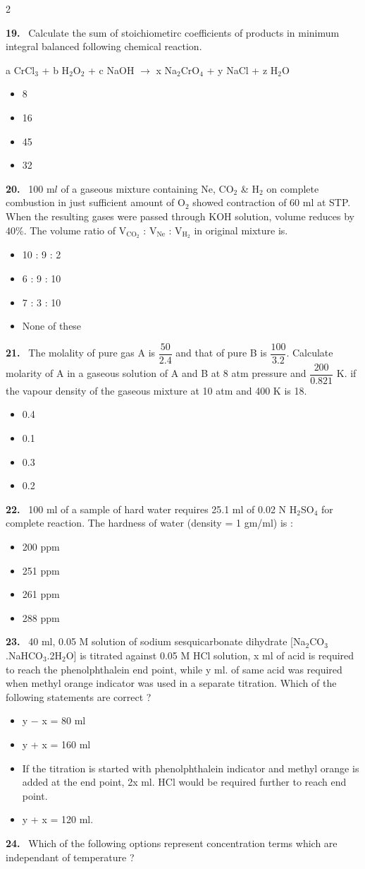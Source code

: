 \documentclass[10pt]{extarticle}
\newcommand{\partsec}[2]{\par\medskip\noindent{\large\bfseries PART-#1: #2}\par\smallskip}
\newcommand{\qn}[1]{\par\smallskip\noindent\textbf{#1.}~}
\newenvironment{qoptions}{\begin{itemize}[leftmargin=1.8em,itemsep=1pt,topsep=2pt,label={}]}{\end{itemize}}
\newcommand{\opt}[2]{\item[(#1)] #2}
\begin{document}
\begin{multicols}{2}
\partsec{2}{CHEMISTRY}
\qn{19} Calculate the sum of stoichiometirc coefficients of products in minimum integral balanced following chemical reaction.\par
a CrCl$_3$ + b H$_2$O$_2$ + c NaOH $\longrightarrow$ x Na$_2$CrO$_4$ + y NaCl + z H$_2$O
\begin{qoptions}
\opt{A}{8}
\opt{B}{16}
\opt{C}{45}
\opt{D}{32}
\end{qoptions}
\qn{20} 100 m$l$ of a gaseous mixture containing Ne, CO$_2$ \& H$_2$ on complete combustion in just sufficient amount of O$_2$ showed contraction of 60 ml at STP. When the resulting gases were passed through KOH solution, volume reduces by 40\%. The volume ratio of V$_{\mathrm{CO}_2}$ : V$_\mathrm{Ne}$ : V$_{\mathrm H_2}$ in original mixture is.
\begin{qoptions}
\opt{A}{10 : 9 : 2}
\opt{B}{6 : 9 : 10}
\opt{C}{7 : 3 : 10}
\opt{D}{None of these}
\end{qoptions}
\qn{21} The molality of pure gas A is $\dfrac{50}{2.4}$ and that of pure B is $\dfrac{100}{3.2}$. Calculate molarity of A in a gaseous solution of A and B at 8 atm pressure and $\dfrac{200}{0.821}$ K. if the vapour density of the gaseous mixture at 10 atm and 400 K is 18.
\begin{qoptions}
\opt{A}{0.4}
\opt{B}{0.1}
\opt{C}{0.3}
\opt{D}{0.2}
\end{qoptions}
\qn{22} 100 ml of a sample of hard water requires 25.1 ml of 0.02 N H$_2$SO$_4$ for complete reaction. The hardness of water (density = 1 gm/ml) is :
\begin{qoptions}
\opt{A}{200 ppm}
\opt{B}{251 ppm}
\opt{C}{261 ppm}
\opt{D}{288 ppm}
\end{qoptions}
\qn{23} 40 ml, 0.05 M solution of sodium sesquicarbonate dihydrate [Na$_2$CO$_3$.NaHCO$_3$.2H$_2$O] is titrated against 0.05 M HCl solution, x ml of acid is required to reach the phenolphthalein end point, while y ml. of same acid was required when methyl orange indicator was used in a separate titration. Which of the following statements are correct ?
\begin{qoptions}
\opt{A}{y $-$ x = 80 ml}
\opt{B}{y + x = 160 ml}
\opt{C}{If the titration is started with phenolphthalein indicator and methyl orange is added at the end point, 2x ml. HCl would be required further to reach end point.}
\opt{D}{y + x = 120 ml.}
\end{qoptions}
\qn{24} Which of the following options represent concentration terms which are independant of temperature ?
\begin{qoptions}

\end{qoptions}
\end{multicols}
\end{document}
